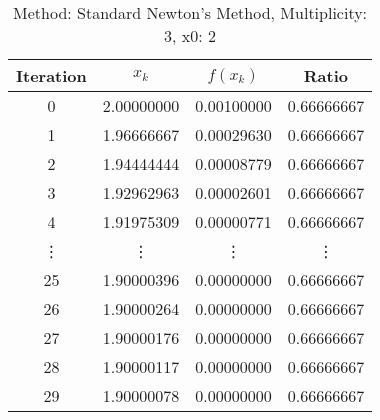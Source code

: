 \begin{table}
\centering
\caption{Method: Standard Newton's Method, Multiplicity: 3, x0: 2}
\label{tab:table_Standard_Newton's_Method_3_2}
\begin{tabular}{c c c c}
\toprule
Iteration &      $x_k$ &   $f(x_k)$ &      Ratio \\
\midrule
        0 & 2.00000000 & 0.00100000 & 0.66666667 \\
        1 & 1.96666667 & 0.00029630 & 0.66666667 \\
        2 & 1.94444444 & 0.00008779 & 0.66666667 \\
        3 & 1.92962963 & 0.00002601 & 0.66666667 \\
        4 & 1.91975309 & 0.00000771 & 0.66666667 \\
   \vdots &     \vdots &     \vdots &     \vdots \\
       25 & 1.90000396 & 0.00000000 & 0.66666667 \\
       26 & 1.90000264 & 0.00000000 & 0.66666667 \\
       27 & 1.90000176 & 0.00000000 & 0.66666667 \\
       28 & 1.90000117 & 0.00000000 & 0.66666667 \\
       29 & 1.90000078 & 0.00000000 & 0.66666667 \\
\bottomrule
\end{tabular}
\end{table}
